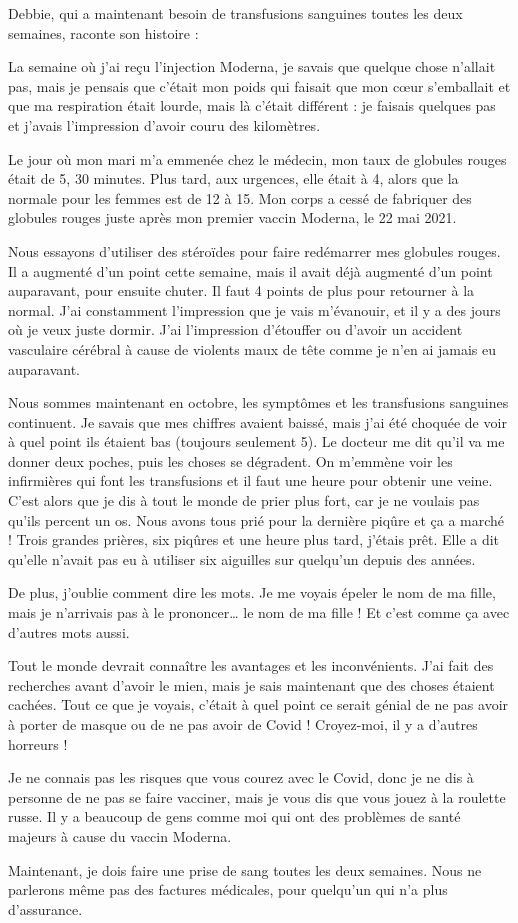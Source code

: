Debbie, qui a maintenant besoin de transfusions sanguines toutes les deux
semaines, raconte son histoire :

La semaine où j'ai reçu l'injection Moderna, je savais que quelque chose
n'allait pas, mais je pensais que c'était mon poids qui faisait que mon cœur
s'emballait et que ma respiration était lourde, mais là c'était différent : je
faisais quelques pas et j'avais l'impression d'avoir couru des kilomètres.

Le jour où mon mari m'a emmenée chez le médecin, mon taux de globules rouges
était de 5, 30 minutes. Plus tard, aux urgences, elle était à 4, alors que la
normale pour les femmes est de 12 à 15. Mon corps a cessé de fabriquer des
globules rouges juste après mon premier vaccin Moderna, le 22 mai 2021.

Nous essayons d'utiliser des stéroïdes pour faire redémarrer mes globules
rouges. Il a augmenté d'un point cette semaine, mais il avait déjà augmenté d'un
point auparavant, pour ensuite chuter. Il faut 4 points de plus pour retourner à
la normal. J'ai constamment l'impression que je vais m'évanouir, et il y a des
jours où je veux juste dormir. J'ai l'impression d'étouffer ou d'avoir un
accident vasculaire cérébral à cause de violents maux de tête comme je n'en ai
jamais eu auparavant.

Nous sommes maintenant en octobre, les symptômes et les transfusions sanguines
continuent. Je savais que mes chiffres avaient baissé, mais j'ai été choquée de
voir à quel point ils étaient bas (toujours seulement 5). Le docteur me dit
qu'il va me donner deux poches, puis les choses se dégradent. On m'emmène voir
les infirmières qui font les transfusions et il faut une heure pour obtenir une
veine. C'est alors que je dis à tout le monde de prier plus fort, car je ne
voulais pas qu'ils percent un os. Nous avons tous prié pour la dernière piqûre
et ça a marché ! Trois grandes prières, six piqûres et une heure plus tard,
j'étais prêt. Elle a dit qu'elle n'avait pas eu à utiliser six aiguilles sur
quelqu'un depuis des années.

De plus, j'oublie comment dire les mots. Je me voyais épeler le nom de ma fille,
mais je n'arrivais pas à le prononcer… le nom de ma fille ! Et c'est comme ça
avec d'autres mots aussi.

Tout le monde devrait connaître les avantages et les inconvénients. J'ai fait
des recherches avant d'avoir le mien, mais je sais maintenant que des choses
étaient cachées. Tout ce que je voyais, c'était à quel point ce serait génial de
ne pas avoir à porter de masque ou de ne pas avoir de Covid ! Croyez-moi, il y a
d'autres horreurs !

Je ne connais pas les risques que vous courez avec le Covid, donc je ne dis à
personne de ne pas se faire vacciner, mais je vous dis que vous jouez à la
roulette russe. Il y a beaucoup de gens comme moi qui ont des problèmes de santé
majeurs à cause du vaccin Moderna.

Maintenant, je dois faire une prise de sang toutes les deux semaines. Nous ne
parlerons même pas des factures médicales, pour quelqu'un qui n'a plus
d'assurance.
